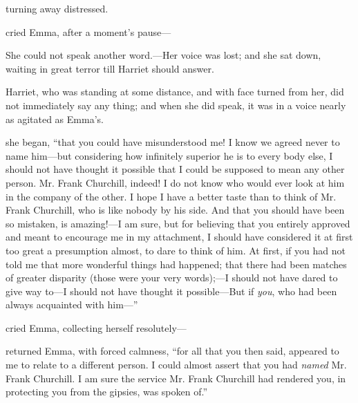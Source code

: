  turning away distressed.

 cried Emma, after a moment's pause---

She could not speak another word.---Her voice was lost; and she sat down, waiting in great terror till Harriet should answer.

Harriet, who was standing at some distance, and with face turned from her, did not immediately say any thing; and when she did speak, it was in a voice nearly as agitated as Emma's.

 she began, “that you could have misunderstood me! I know we agreed never to name him---but considering how infinitely superior he is to every body else, I should not have thought it possible that I could be supposed to mean any other person. Mr. Frank Churchill, indeed! I do not know who would ever look at him in the company of the other. I hope I have a better taste than to think of Mr. Frank Churchill, who is like nobody by his side. And that you should have been so mistaken, is amazing!---I am sure, but for believing that you entirely approved and meant to encourage me in my attachment, I should have considered it at first too great a presumption almost, to dare to think of him. At first, if you had not told me that more wonderful things had happened; that there had been matches of greater disparity (those were your very words);---I should not have dared to give way to---I should not have thought it possible---But if {\em you}, who had been always acquainted with him---”

 cried Emma, collecting herself resolutely---


 returned Emma, with forced calmness, “for all that you then said, appeared to me to relate to a different person. I could almost assert that you had {\em named} Mr. Frank Churchill. I am sure the service Mr. Frank Churchill had rendered you, in protecting you from the gipsies, was spoken of.”

